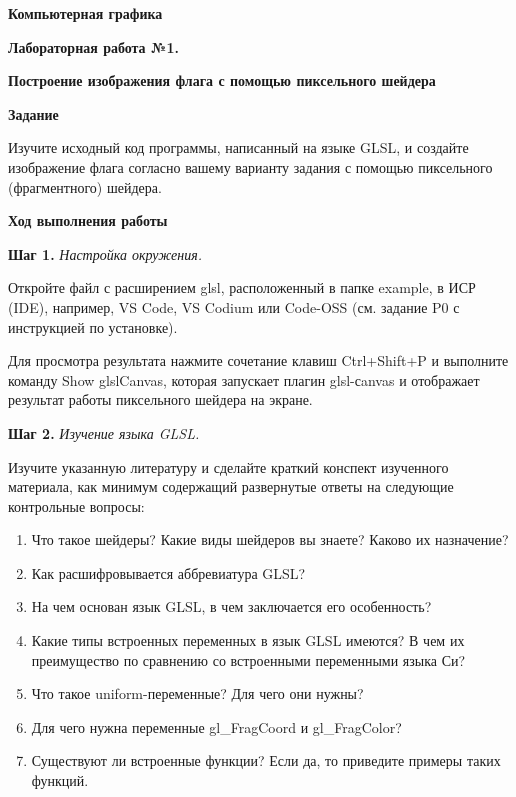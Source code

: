 \documentclass[a4paper,12pt]{article}
\theoremstyle{plain}
\begin{document}
    \begin{center}
    \textbf{{\Large Компьютерная графика}}
    
    \textbf{{\large Лабораторная работа №1. }}
    
    \textbf{{\large Построение изображения флага с помощью пиксельного шейдера}}
    \end{center}
    
    
    \textbf{Задание}
    
    Изучите исходный код программы, написанный на языке GLSL, и создайте изображение флага согласно вашему варианту задания с помощью пиксельного (фрагментного) шейдера.
        
    \textbf{Ход выполнения работы}
    
    \textbf{Шаг 1. }\textit{Настройка окружения.} 
        
    Откройте файл с расширением glsl, расположенный в папке \textquotedbl example\textquotedbl, в ИСР (IDE), например, VS Code, VS Codium или Code-OSS (см. задание P0 с инструкцией по установке). 
    
    Для просмотра результата нажмите сочетание клавиш Ctrl+Shift+P и выполните команду \textquotedbl Show glslCanvas\textquotedbl, которая запускает плагин glsl-сanvas и отображает результат работы пиксельного шейдера на экране.
    
    \textbf{Шаг 2.} \textit{Изучение языка GLSL.} 
    
    Изучите указанную литературу и сделайте краткий конспект изученного материала, как минимум содержащий развернутые ответы на следующие контрольные вопросы:
    \begin{enumerate}
    \item Что такое шейдеры? Какие виды шейдеров вы знаете? Каково их назначение?
    \item Как расшифровывается аббревиатура GLSL?
    \item На чем основан язык GLSL, в чем заключается его особенность?
    \item Какие типы встроенных переменных в язык GLSL имеются? В чем их преимущество по сравнению со встроенными переменными языка Си?
    \item Что такое uniform-переменные? Для чего они нужны?
    \item Для чего нужна переменные gl\_FragCoord и gl\_FragColor?
    \item Существуют ли встроенные функции? Если да, то приведите примеры таких функций.
    \end{enumerate}
    
\end{document}
